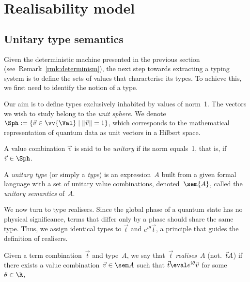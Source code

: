 \section{Realisability model}\label{sec:model}
\subsection{Unitary type semantics}
Given the deterministic machine presented in the previous section
(see~Remark~\ref{rmk:determinism}), the next
step towards extracting a typing system is to define the sets of values that
characterise its types. To achieve this, we first need to identify the notion
of a type.

Our aim is to define types exclusively inhabited by values of norm~1. The
vectors we wish to study belong to the \emph{unit sphere}. We denote $\Sph 
:= \{\vec v \in \vv{\Val} \mid \|\vec v\| = 1\}$, which
corresponds to the mathematical representation of quantum data as unit vectors
in a Hilbert space.

\begin{definition}
  A value combination $\vec{v}$ is said to be \emph{unitary} if its norm equals~1,
  that is, if $\vec{v}\in\Sph$.
\end{definition}

\begin{definition}
  A \emph{unitary type} (or simply a \emph{type}) is an expression~$A$ built from
  a given formal language with a set of unitary value combinations, denoted~$\sem{A}$,
  called the \emph{unitary semantics} of~$A$.
\end{definition}

We now turn to type realisers.  
Since the global phase of a quantum state has no physical significance, terms
that differ only by a phase should share the same type.  
Thus, we assign identical types to $\vec t$ and $e^{i\theta}\vec t$, a principle
that guides the definition of realisers.

\begin{definition}\label{def:realiser}
  Given a term combination~$\vec t$ and type~$A$, we say that~$\vec t$
  \emph{realises}~$A$ (not.~$\vec t \real A$) if there exists a value
  combination~$\vec v\in\sem A$ such that
  $\vec{t}\eval e^{i\theta}\vec{v}$ for some $\theta\in\R$,
\end{definition}

